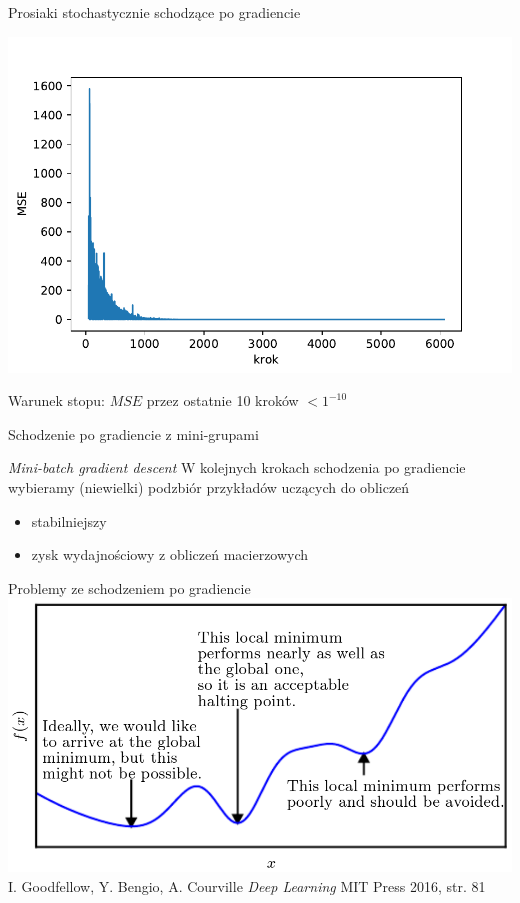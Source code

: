 \documentclass{sa}
\begin{document}
\begin{frame}{Prosiaki stochastycznie schodzące po gradiencie}
\begin{center}
\includegraphics[width=.9\textwidth]{sgd-prosiaki.pdf}
\end{center}

Warunek stopu: $MSE$ przez ostatnie 10 kroków $<1^{-10}$
\end{frame}

\begin{frame}{Schodzenie po gradiencie z mini-grupami}
\begin{block}{\emph{Mini-batch gradient descent}}
W kolejnych krokach schodzenia po gradiencie wybieramy (niewielki) podzbiór przykładów uczących do obliczeń
\end{block}
\begin{itemize}
\item stabilniejszy
\item zysk wydajnościowy z obliczeń macierzowych
\end{itemize}
\end{frame}


\begin{frame}{Problemy ze schodzeniem po gradiencie}
\centering
\includegraphics[width=\textwidth]{grad-problemy.png}
{\vfill\footnotesize I. Goodfellow, Y. Bengio, A. Courville \emph{Deep Learning} MIT Press 2016, str. 81}
\end{frame}
\end{document}
